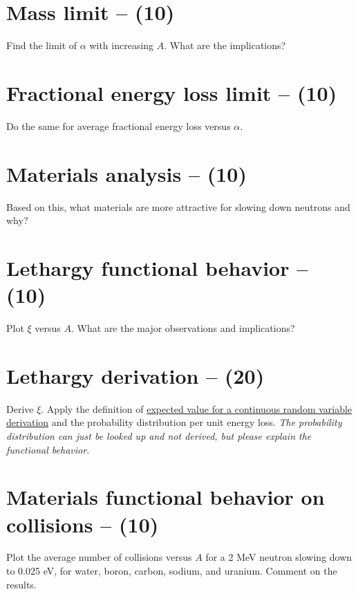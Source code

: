 \documentclass[11pt,a4paper]{article}
\begin{document}
\newpage

\section{Mass limit  -- (10)}
Find the limit of $\alpha$ with increasing $A$. What are the implications?





\newpage

\section{Fractional energy loss limit -- (10)}
Do the same for average fractional energy loss versus $\alpha$.





\newpage

\section{Materials analysis -- (10)}
Based on this, what materials are more attractive for slowing down neutrons and why?





\newpage


\section{Lethargy functional behavior -- (10)}
Plot $\xi$ versus $A$. What are the major observations and implications?





\newpage

\section{Lethargy derivation -- (20)}
Derive $\xi$. Apply the definition of \href{https://uidaho.pressbooks.pub/riskassessment/chapter/statistical-moments/}{expected value for a continuous random variable derivation} and the probability distribution per unit energy loss. \textit{The probability distribution can just be looked up and not derived, but please explain the functional behavior.}





\newpage

\section{Materials functional behavior on collisions -- (10)}
Plot the average number of collisions versus $A$ for a 2 MeV neutron slowing down to 0.025 eV, for water, boron, carbon, sodium, and uranium. Comment on the results.
\end{document}
